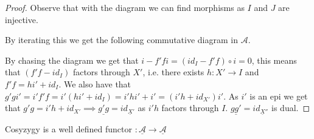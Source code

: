     \begin{proof}
        Observe that with the diagram we can find morphisms as $I$ and $J$ are injective.
        \begin{center}
        \end{center}
        By iterating this we get the following commutative diagram in $\mathcal{A}$.
        \begin{center}
        \end{center}
        By chasing the diagram we get that $i-f'fi=(id_I-f'f)\circ i = 0$, this means that $(f'f-id_I)$ factors through $X'$, i.e. there exists $h:X'\rightarrow I$ and $f'f = hi'+id_I$. We also have that $g'gi' = i'f'f = i'(hi' +id_I) = i'hi' + i' = (i'h+id_{X'})i'$. As $i'$ is an epi we get that $g'g = i'h + id_{X'} \implies \underline{g'g}=id_{\underline{X}'}$ as $i'h$ factors through $I$. $\underline{gg'}=id_{\underline{X}''}$ is dual.
    \end{proof}

    \begin{corollary}
        Cosyzygy is a well defined functor $:\underline{\mathcal{A}}\rightarrow\underline{\mathcal{A}}$
    \end{corollary}


